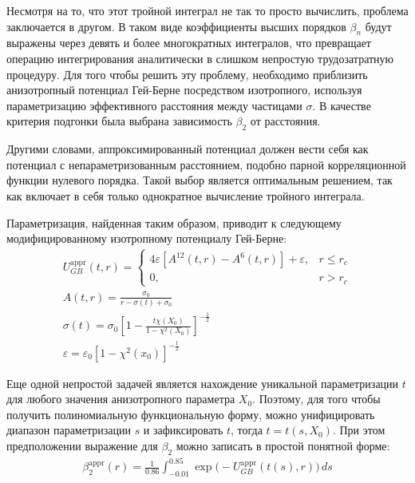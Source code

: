 \documentclass[a4paper,14pt]{extarticle}
\begin{document}
    Несмотря на то, что этот тройной интеграл не так то просто вычислить, проблема заключается в другом. В таком виде коэффициенты высших порядков $\beta_n$ будут выражены через девять и более многократных интегралов, что превращает операцию интегрирования аналитически в слишком непростую трудозатратную процедуру. Для того чтобы решить эту проблему, необходимо приблизить анизотропный потенциал Гей-Берне посредством изотропного, используя параметризацию эффективного расстояния между частицами $\sigma$. В качестве критерия подгонки была выбрана зависимость
    $\beta_2$ от расстояния.

    Другими словами, аппроксимированный потенциал должен вести себя как потенциал с непараметризованным расстоянием, подобно парной корреляционной функции нулевого порядка. Такой выбор является оптимальным решением, так как включает в себя только однократное вычисление тройного интеграла.

    Параметризация, найденная таким образом, приводит к следующему модифицированному изотропному потенциалу Гей-Берне:
    \begin{gather*}
        U^{\mathrm{appr}}_{GB}(t, r)=
        \begin{cases}
            4 \varepsilon
            [A^{12}(t, r) - A^6(t, r)]
            + \varepsilon,
            & r \leqslant r_c \\
            0, & r > r_c
        \end{cases} \\
        A(t, r)
        = \frac{\sigma_0}{r - \sigma(t) + \sigma_0} \\
        \sigma(t) = \sigma_0 \left[
        1 - \frac{t \chi(X_0)}{1 - \chi^2 (X_0)}
        \right]^{-\frac12} \\
        \varepsilon = \varepsilon_0 [1 - \chi^2(x_0)]^{-\frac12}
    \end{gather*}

    Еще одной непростой задачей является нахождение уникальной параметризации $t$ для любого значения анизотропного параметра $X_0$. Поэтому, для того чтобы получить полиномиальную функциональную форму, можно унифицировать диапазон параметризации $s$ и зафиксировать $t$, тогда $t = t(s, X_0)$. При этом предположении выражение для $\beta_2$ можно записать в простой понятной форме:
    \begin{gather*}
        \beta^{\mathrm{appr}}_2(r)
        = \frac{1}{0.86} \int_{-0.01}^{0.85}
        \exp\big(
        -U^{\mathrm{appr}}_{GB}(t(s), r)
        \big) \, ds
    \end{gather*}
\end{document}
